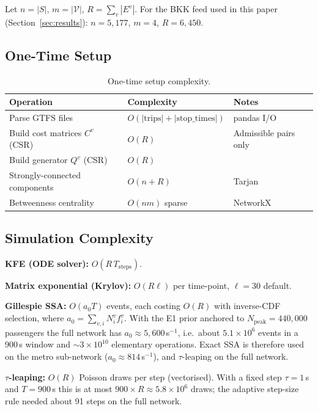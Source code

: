 \documentclass[12pt,a4paper]{article}
\theoremstyle{plain}
\theoremstyle{definition}
\theoremstyle{remark}
\begin{document}
Let $n=|S|$, $m=|\mathcal{V}|$, $R=\sum_v|E^v|$.  For the BKK feed used in
this paper (Section~\ref{sec:results}): $n=5{,}177$, $m=4$, $R=6{,}450$.

\subsection{One-Time Setup}

\begin{table}[htbp]
\centering
\small
\begin{tabular}{lll}
\toprule
Operation & Complexity & Notes \\
\midrule
Parse GTFS files                 & $O(|\mathrm{trips}|+|\mathrm{stop\_times}|)$ & pandas I/O \\
Build cost matrices $C^v$ (CSR) & $O(R)$                                       & Admissible pairs only \\
Build generator $Q^v$ (CSR)     & $O(R)$                                       & \\
Strongly-connected components   & $O(n+R)$                                     & Tarjan \\
Betweenness centrality          & $O(nm)$ sparse                               & NetworkX \\
\bottomrule
\end{tabular}
\caption{One-time setup complexity.}
\end{table}

\subsection{Simulation Complexity}

\textbf{KFE (ODE solver):} $O(R\,T_{\mathrm{steps}})$.

\textbf{Matrix exponential (Krylov):}
$O(R\ell)$ per time-point, $\ell=30$ default.

\textbf{Gillespie SSA:} $O(a_0 T)$ events, each costing $O(R)$ with
inverse-CDF selection, where $a_0=\sum_{v,i}N_i^v f_i^v$.  With the E1 prior
anchored to $N_{\mathrm{peak}}=440{,}000$ passengers the full network has
$a_0\approx5{,}600$\,s$^{-1}$, i.e.\ about $5.1\times10^6$ events in a 900\,s
window and ${\sim}3\times10^{10}$ elementary operations.  Exact SSA is
therefore used on the metro sub-network ($a_0\approx814$\,s$^{-1}$), and
$\tau$-leaping on the full network.

\textbf{$\tau$-leaping:} $O(R)$ Poisson draws per step (vectorised).
With a fixed step $\tau=1$\,s and $T=900$\,s this is at most
$900\times R\approx5.8\times10^6$ draws; the adaptive step-size rule needed
about 91 steps on the full network.
\end{document}
